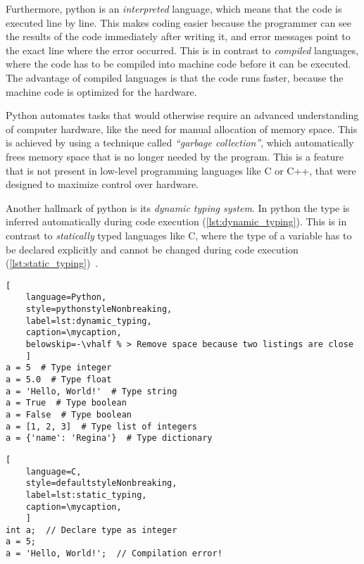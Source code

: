 Furthermore, python is an \textit{interpreted} language, which means that the
code is executed line by line. This makes coding easier because the programmer
can see the results of the code immediately after writing it, and error messages
point to the exact line where the error occurred. This is in contrast to
\textit{compiled} languages, where the code has to be compiled into machine code
before it can be executed. The advantage of compiled languages is that the code
runs faster, because the machine code is optimized for the hardware.

Python automates tasks that would otherwise require an advanced understanding of
computer hardware, like the need for manual allocation of memory space. This is
achieved by using a technique called \textit{``garbage collection''}, which
automatically frees memory space that is no longer needed by the program. This
is a feature that is not present in low-level programming languages like C or
C++, that were designed to maximize control over hardware.

Another hallmark of python is its \textit{dynamic typing system}. In python the
type  is inferred automatically during code execution
(\autoref{lst:dynamic_typing}). This is in contrast to \textit{statically} typed
languages like C, where the type of a variable has to be declared explicitly and
cannot be changed during code execution
(\autoref{lst:static_typing})~\cite{PythonLanguageReference}.

\def\mycaption{ Example of dynamic typing in python. The variable ``\texttt{a}''
    is assigned the value 5, which is of type integer. The variable ``\texttt{a}''
    is then assigned the value ``\texttt{Hello, World!}'', which is of type string.
    Python allows dynamic re-assignment of variables with different types. Note that
    code after ``\texttt{\#}'' is considered a comment and won't be executed.}
\begin{lstlisting}[
    language=Python,
    style=pythonstyleNonbreaking,
    label=lst:dynamic_typing,
    caption=\mycaption,
    belowskip=-\vhalf % > Remove space because two listings are close
    ]
a = 5  # Type integer
a = 5.0  # Type float
a = 'Hello, World!'  # Type string
a = True  # Type boolean
a = False  # Type boolean
a = [1, 2, 3]  # Type list of integers
a = {'name': 'Regina'}  # Type dictionary
\end{lstlisting}

\def\mycaption{ Example of static typing in C. The variable ``\texttt{a}'' is
    declared as an integer (\texttt{int}), and can only store integers. The
    variable ``\texttt{a}'' is then assigned the value 5, which is an integer.
    The variable ``\texttt{a}'' is then assigned the value \texttt{'Hello,
        World!'}, which is a string. This results in a compilation error, because
    the variable ``\texttt{a}'' can only store integers. Note that code after
    ``\texttt{//}'' is considered a comment and won't be executed. }
\begin{lstlisting}[
    language=C,
    style=defaultstyleNonbreaking,
    label=lst:static_typing,
    caption=\mycaption,
    ]
int a;  // Declare type as integer
a = 5;
a = 'Hello, World!';  // Compilation error!
\end{lstlisting}

